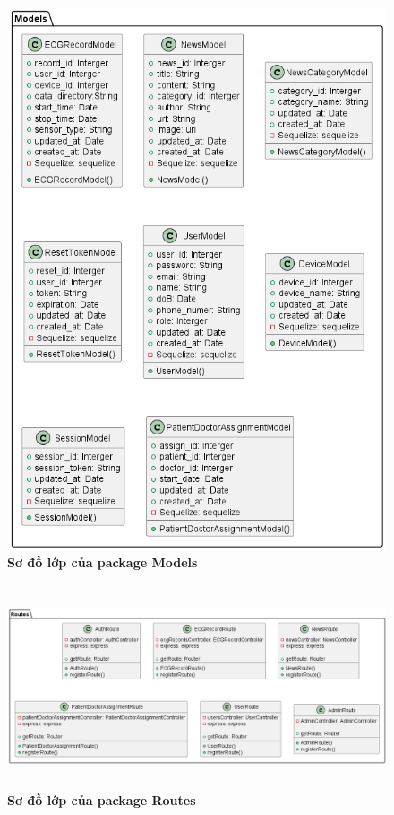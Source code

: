 \begin{enumerate}[a)]
\begin{figure}[H]
  \centering
  \includegraphics[width=15cm,height=16cm]{Images/server/class/class_model.png}
  \caption[Sơ đồ lớp của package Models]{\bfseries \fontsize{12pt}{0pt}\selectfont Sơ đồ lớp của package Models}
  \label{class_model} %
\end{figure}


\begin{figure}[H]
  \centering
  \includegraphics[width=14cm,height=6cm]{Images/server/class/class_route.png}
  \caption[Sơ đồ lớp của package Routes]{\bfseries \fontsize{12pt}{0pt}\selectfont Sơ đồ lớp của package Routes}
  \label{class_route} %
\end{figure}



\end{enumerate}
